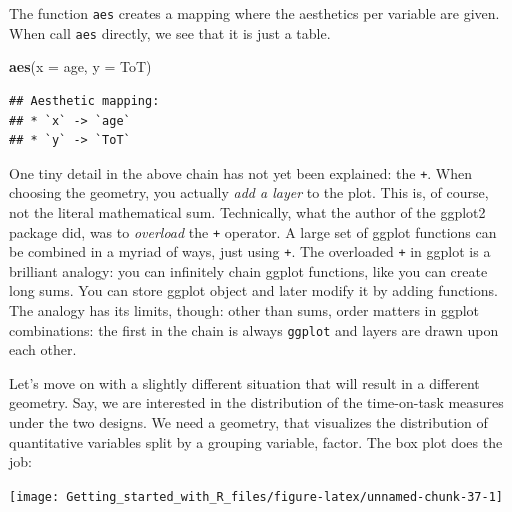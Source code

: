 \documentclass[]{svmono}
\newenvironment{Shaded}{\begin{snugshade}}{\end{snugshade}}
\newcommand{\KeywordTok}[1]{\textcolor[rgb]{0.13,0.29,0.53}{\textbf{#1}}}
\newcommand{\DataTypeTok}[1]{\textcolor[rgb]{0.13,0.29,0.53}{#1}}
\newcommand{\StringTok}[1]{\textcolor[rgb]{0.31,0.60,0.02}{#1}}
\newcommand{\OperatorTok}[1]{\textcolor[rgb]{0.81,0.36,0.00}{\textbf{#1}}}
\newcommand{\NormalTok}[1]{#1}
\begin{document}
The function \texttt{aes} creates a mapping where the aesthetics per
variable are given. When call \texttt{aes} directly, we see that it is
just a table.

\begin{Shaded}
\begin{Highlighting}[]
\KeywordTok{aes}\NormalTok{(}\DataTypeTok{x =}\NormalTok{ age, }\DataTypeTok{y =}\NormalTok{ ToT)}
\end{Highlighting}
\end{Shaded}

\begin{verbatim}
## Aesthetic mapping: 
## * `x` -> `age`
## * `y` -> `ToT`
\end{verbatim}

One tiny detail in the above chain has not yet been explained: the
\texttt{+}. When choosing the geometry, you actually \emph{add a layer}
to the plot. This is, of course, not the literal mathematical sum.
Technically, what the author of the ggplot2 package did, was to
\emph{overload} the \texttt{+} operator. A large set of ggplot functions
can be combined in a myriad of ways, just using \texttt{+}. The
overloaded \texttt{+} in ggplot is a brilliant analogy: you can
infinitely chain ggplot functions, like you can create long sums. You
can store ggplot object and later modify it by adding functions. The
analogy has its limits, though: other than sums, order matters in ggplot
combinations: the first in the chain is always \texttt{ggplot} and
layers are drawn upon each other.

Let's move on with a slightly different situation that will result in a
different geometry. Say, we are interested in the distribution of the
time-on-task measures under the two designs. We need a geometry, that
visualizes the distribution of quantitative variables split by a
grouping variable, factor. The box plot does the job:

\begin{Shaded}
\end{Shaded}

\texttt{[image: Getting\_started\_with\_R\_files/figure-latex/unnamed-chunk-37-1]}
\end{document}
